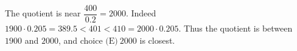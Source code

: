 The quotient is near $\dfrac{400}{0.2}=2000$. Indeed $1900\cdot0.205=389.5<401<410=2000\cdot0.205$. Thus the quotient is between $1900$ and $2000$, and choice $\boxed{\text{(E)}\ 2000}$ is closest.
